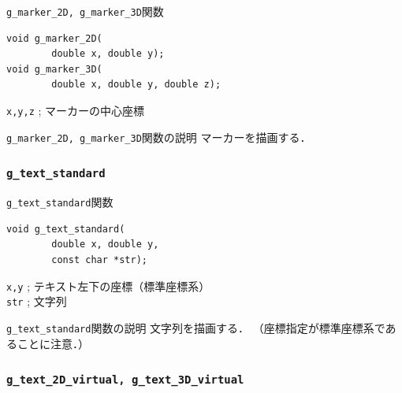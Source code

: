 \documentclass[platex,a4paper,12pt]{jsarticle}%
\begin{document}
\begin{itembox}[l]{\texttt{g\_marker\_2D, g\_marker\_3D}関数}
\begin{verbatim}
void g_marker_2D(
        double x, double y);
void g_marker_3D(
        double x, double y, double z);	
\end{verbatim}
\verb|x,y,z| ; マーカーの中心座標
\end{itembox}

\begin{itembox}[l]{\texttt{g\_marker\_2D, g\_marker\_3D}関数の説明}
マーカーを描画する．
\end{itembox}

\begin{figure}[htb]
\end{figure}




\clearpage
\subsubsection{\texttt{g\_text\_standard}}

\begin{itembox}[l]{\texttt{g\_text\_standard}関数}
\begin{verbatim}
void g_text_standard(
        double x, double y,
        const char *str);
\end{verbatim}
\verb|x,y| ; テキスト左下の座標（標準座標系）\\
\verb|str| ; 文字列
\end{itembox}

\begin{itembox}[l]{\texttt{g\_text\_standard}関数の説明}
文字列を描画する．
（座標指定が標準座標系であることに注意．）
\end{itembox}


\subsubsection{\texttt{g\_text\_2D\_virtual, g\_text\_3D\_virtual}}
\end{document}

